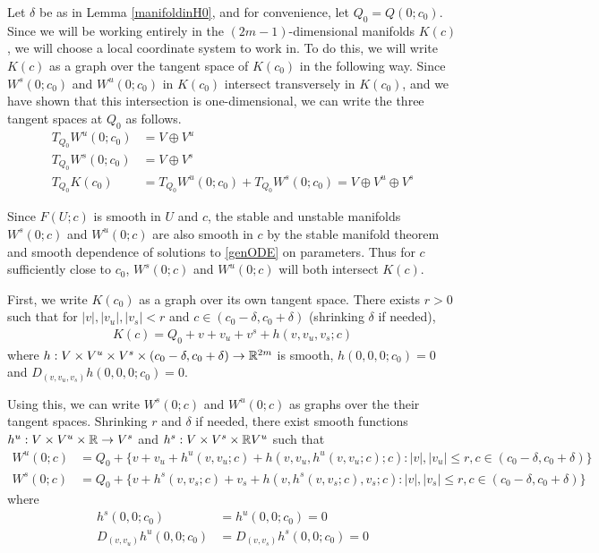 \documentclass[thesis.tex]{subfiles}
\begin{document}
Let $\delta$ be as in Lemma \ref{manifoldinH0}, and for convenience, let $Q_0 = Q(0; c_0)$. Since we will be working entirely in the $(2m-1)$-dimensional manifolds $K(c)$, we will choose a local coordinate system to work in. To do this, we will write $K(c)$ as a graph over the tangent space of $K(c_0)$ in the following way. Since $W^s(0; c_0)$ and $W^u(0; c_0)$ in $K(c_0)$ intersect transversely in $K(c_0)$, and we have shown that this intersection is one-dimensional, we can write the three tangent spaces at $Q_0$ as follows.
\begin{align*}
T_{Q_0}W^u(0; c_0) &= V \oplus V^u \\
T_{Q_0}W^s(0; c_0) &= V \oplus V^s \\
T_{Q_0}K(c_0) &= T_{Q_0}W^u(0; c_0) 
+ T_{Q_0}W^s(0; c_0) = V \oplus V^u \oplus V^s
\end{align*}

Since $F(U; c)$ is smooth in $U$ and $c$, the stable and unstable manifolds $W^s(0; c)$ and $W^u(0; c)$ are also smooth in $c$ by the stable manifold theorem and smooth dependence of solutions to \eqref{genODE} on parameters. Thus for $c$ sufficiently close to $c_0$, $W^s(0; c)$ and $W^u(0; c)$ will both intersect $K(c)$. 

First, we write $K(c_0)$ as a graph over its own tangent space. There exists $r > 0$ such that for $|v|, |v_u|, |v_s| < r$ and $c \in (c_0 - \delta, c_0 + \delta)$ (shrinking $\delta$ if needed), 
\begin{align*}
K(c) = Q_0 + v + v_u + v^s + h(v, v_u, v_s; c)
\end{align*}
where $h: V \times V^u \times V^s \times (c_0 - \delta, c_0 + \delta) \rightarrow \mathbb{R}^{2m}$ is smooth, $h(0,0,0; c_0) = 0$ and $D_{(v, v_u, v_s)} h(0, 0, 0; c_0) = 0$.

Using this, we can write $W^s(0; c)$ and $W^u(0; c)$ as graphs over the their tangent spaces. Shrinking $r$ and $\delta$ if needed, there exist smooth functions $h^u: V \times V^u \times \mathbb{R} \rightarrow V^s$ and $h^s: V \times V^s \times \mathbb{R} V^u$ such that 
\begin{equation}\label{Wparam1}
\begin{aligned}
W^u(0; c) &= Q_0 + \{ v + v_u + h^u(v, v_u; c) + h(v, v_u, h^u(v, v_u; c); c): |v|, |v_u| \leq r, c \in (c_0 - \delta, c_0 + \delta) \} \\
W^s(0; c) &= Q_0 + \{ v + h^s(v, v_s; c) + v_s + h(v, h^s(v, v_s; c), v_s; c): |v|, |v_s| \leq r, c \in (c_0 - \delta, c_0 + \delta)  \}
\end{aligned}
\end{equation}
where
\begin{align*}
h^s(0, 0; c_0) &= h^u(0, 0; c_0) = 0 \\
D_{(v, v_u)} h^u(0, 0; c_0) &= D_{(v, v_s)}  h^s(0, 0; c_0) = 0
\end{align*}
\end{document}
